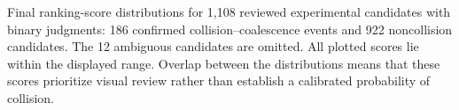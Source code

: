 Final ranking-score distributions for 1,108 reviewed experimental candidates with binary judgments: 186 confirmed collision--coalescence events and 922 noncollision candidates. The 12 ambiguous candidates are omitted. All plotted scores lie within the displayed range. Overlap between the distributions means that these scores prioritize visual review rather than establish a calibrated probability of collision.
